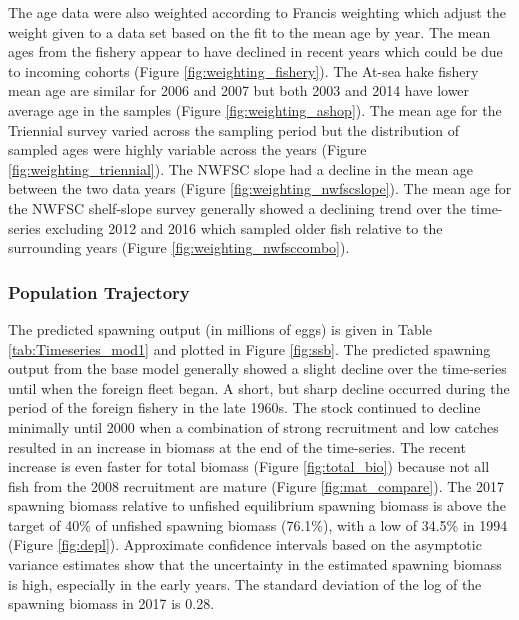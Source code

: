 \documentclass[12pt,]{article}
\begin{document}
The age data were also weighted according to Francis weighting which
adjust the weight given to a data set based on the fit to the mean age
by year. The mean ages from the fishery appear to have declined in
recent years which could be due to incoming cohorts (Figure
\ref{fig:weighting_fishery}). The At-sea hake fishery mean age are
similar for 2006 and 2007 but both 2003 and 2014 have lower average age
in the samples (Figure \ref{fig:weighting_ashop}). The mean age for the
Triennial survey varied across the sampling period but the distribution
of sampled ages were highly variable across the years (Figure
\ref{fig:weighting_triennial}). The NWFSC slope had a decline in the
mean age between the two data years (Figure
\ref{fig:weighting_nwfscslope}). The mean age for the NWFSC shelf-slope
survey generally showed a declining trend over the time-series excluding
2012 and 2016 which sampled older fish relative to the surrounding years
(Figure \ref{fig:weighting_nwfsccombo}).

\subsubsection{Population Trajectory}\label{population-trajectory}

The predicted spawning output (in millions of eggs) is given in Table
\ref{tab:Timeseries_mod1} and plotted in Figure \ref{fig:ssb}. The
predicted spawning output from the base model generally showed a slight
decline over the time-series until when the foreign fleet began. A
short, but sharp decline occurred during the period of the foreign
fishery in the late 1960s. The stock continued to decline minimally
until 2000 when a combination of strong recruitment and low catches
resulted in an increase in biomass at the end of the time-series. The
recent increase is even faster for total biomass (Figure
\ref{fig:total_bio}) because not all fish from the 2008 recruitment are
mature (Figure \ref{fig:mat_compare}). The 2017 spawning biomass
relative to unfished equilibrium spawning biomass is above the target of
40\% of unfished spawning biomass (76.1\%), with a low of 34.5\% in 1994
(Figure \ref{fig:depl}). Approximate confidence intervals based on the
asymptotic variance estimates show that the uncertainty in the estimated
spawning biomass is high, especially in the early years. The standard
deviation of the log of the spawning biomass in 2017 is 0.28.
\end{document}
